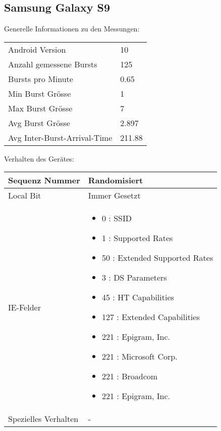 \subsection*{Samsung Galaxy S9}
Generelle Informationen zu den Messungen:

\begin{table}[h!]
    \begin{tabularx}{\textwidth}{l X }
        \toprule
        Android Version & 10 \\
        Anzahl gemessene Bursts & 125 \\
        Bursts pro Minute & 0.65 \\
        Min Burst Grösse & 1 \\
        Max Burst Grösse & 7 \\
        Avg Burst Grösse & 2.897 \\
        Avg Inter-Burst-Arrival-Time & 211.88 \\
        \bottomrule
    \end{tabularx}
\end{table}

Verhalten des Gerätes:

\begin{table}[h!]
    \begin{tabularx}{\textwidth}{l X }
        \toprule
        Sequenz Nummer & Randomisiert \\
        \midrule
        Local Bit & Immer Gesetzt \\
        \midrule
        IE-Felder & \begin{itemize}
            \item 0 : SSID
            \item 1 : Supported Rates
            \item 50 : Extended Supported Rates
            \item 3 : DS Parameters
            \item 45 : HT Capabilities
            \item 127 : Extended Capabilities
            \item 221 : Epigram, Inc.
            \item 221 : Microsoft Corp.
            \item 221 : Broadcom
            \item 221 : Epigram, Inc.
        \end{itemize} \\
        \midrule
        Spezielles Verhalten & - \\
        \bottomrule
    \end{tabularx}
\end{table}
\clearpage


